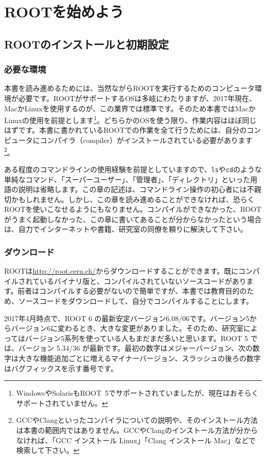 \chapter{ROOTを始めよう}
\label{chapter_Install}
\section{ROOTのインストールと初期設定}
\label{sec_ROOT_install}
\subsection{必要な環境}
本書を読み進めるためには、当然ながらROOTを実行するためのコンピュータ環境が必要です。ROOTがサポートするOSは多岐にわたりますが、2017年現在、MacかLinuxを使用するのが、この業界では標準です。そのため本書ではMacかLinuxの使用を前提とします\footnote{WindowsやSolarisもROOT~5でサポートされていましたが、現在はおそらくサポートされていません。}。どちらかのOSを使う限り、作業内容はほぼ同じはずです。本書に書かれているROOTでの作業を全て行うためには、自分のコンピュータにコンパイラ（compiler）がインストールされている必要があります\footnote{GCCやClangといったコンパイラについての説明や、そのインストール方法は本書の範囲内ではありません。GCCやClangのインストール方法が分からなければ、「GCC インストール Linux」「Clang インストール Mac」などで検索して下さい。}。

ある程度のコマンドラインの使用経験を前提としていますので、\texttt{ls}や\texttt{cd}のような単純なコマンド、「スーパーユーザー」、「管理者」、「ディレクトリ」といった用語の説明は省略します。この章の記述は、コマンドライン操作の初心者には不親切かもしれません。しかし、この章を読み進めることができなければ、恐らくROOTを使いこなせるようにもなりません。コンパイルができなかった、ROOTがうまく起動しなかった、この章に書いてあることが分からなかったという場合は、自力でインターネットや書籍、研究室の同僚を頼りに解決して下さい。

\subsection{ダウンロード}
\label{subsec_download}
ROOTは\url{http://root.cern.ch/}からダウンロードすることができます。既にコンパイルされているバイナリ版と、コンパイルされていないソースコードがあります。前者はコンパイルする必要がないので簡単ですが、本書では教育目的のため、ソースコードをダウンロードして、自分でコンパイルすることにします。

2017年4月時点で、ROOT 6 の最新安定バージョン6.08/06です。バージョン5からバージョン6に変わるとき、大きな変更がありました。そのため、研究室によってはバージョン5系列を使っている人もまだまだ多いと思います。ROOT 5 では、バージョン 5.34/36 が最新です。最初の数字はメジャーバージョン、次の数字は大きな機能追加ごとに増えるマイナーバージョン、スラッシュの後ろの数字はバグフィックスを示す番号です。

